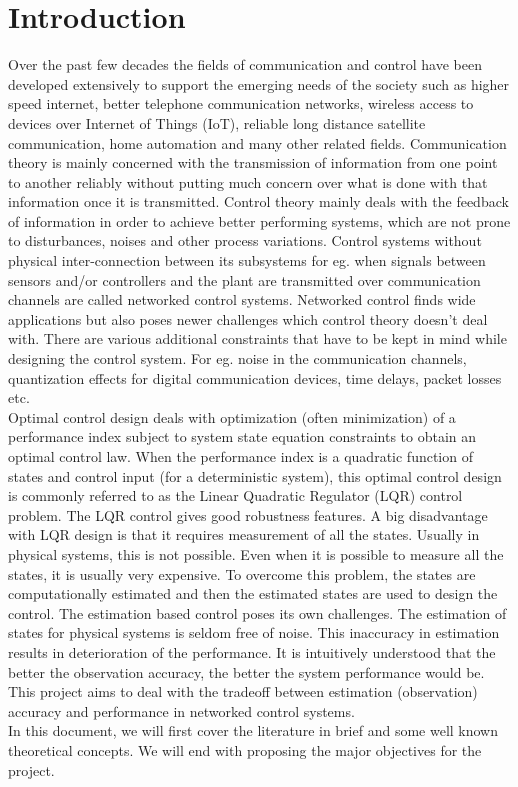 \documentclass[a4paper,12pt]{article}
\begin{document}
\section{Introduction}
\label{intro}
	Over the past few decades the fields of communication and control have been developed extensively to support the emerging needs of the society such as higher speed internet, better telephone communication networks, wireless access to devices over Internet of Things (IoT), reliable long distance satellite communication, home automation and many other related fields. Communication theory is mainly concerned with the transmission of information from one point to another reliably without putting much concern over what is done with that information once it is transmitted. Control theory mainly deals with the feedback of information in order to achieve better performing systems, which are not prone to disturbances, noises and other process variations. Control systems without physical inter-connection between its subsystems for eg. when signals between sensors and/or controllers and the plant are transmitted over communication channels are called networked control systems. Networked control finds wide applications but also poses newer challenges which control theory doesn't deal with. There are various additional constraints that have to be kept in mind while designing the control system. For eg. noise in the communication channels, quantization effects for digital communication devices, time delays, packet losses etc. \\
    Optimal control design deals with optimization (often minimization) of a performance index subject to system state equation constraints to obtain an optimal control law. When the performance index is a quadratic function of states and control input (for a deterministic system), this optimal control design is commonly referred to as the Linear Quadratic Regulator (LQR) control problem. The LQR control gives good robustness features. A big disadvantage with LQR design is that it requires measurement of all the states. Usually in physical systems, this is not possible. Even when it is possible to measure all the states, it is usually very expensive. To overcome this problem, the states are computationally estimated and then the estimated states are used to design the control. The estimation based control poses its own challenges. The estimation of states for physical systems is seldom free of noise. This inaccuracy in estimation results in deterioration of the performance.  It is intuitively understood that the better the observation accuracy, the better the system performance would be. This project aims to deal with the tradeoff between estimation (observation) accuracy and performance in networked control systems. \\
   In this document, we will first cover the literature in brief and some well known theoretical concepts. We will end with proposing the major objectives for the project.
   \\
\end{document}
